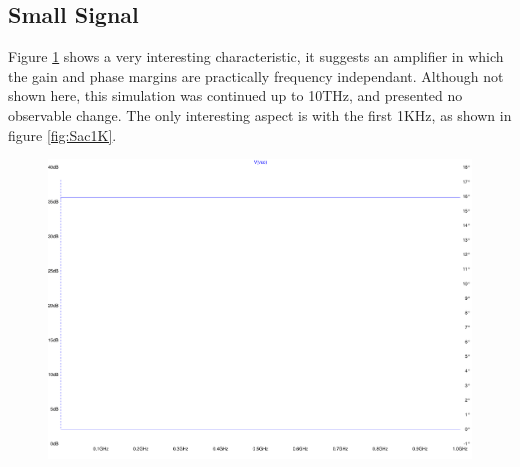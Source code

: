\subsection{Small Signal}

Figure \ref{fig:Sac} shows a very interesting characteristic, it suggests an amplifier in which the gain and phase margins are practically frequency independant.
Although not shown here, this simulation was continued up to 10THz, and presented no observable change.
The only interesting aspect is with the first 1KHz, as shown in figure \ref{fig:Sac1K}.

\begin{figure}[H]
	\centering
	\includegraphics[width=\textwidth]{./images/BasicAC-out.pdf}
	\caption{}
	\label{fig:Sac}
\end{figure}

